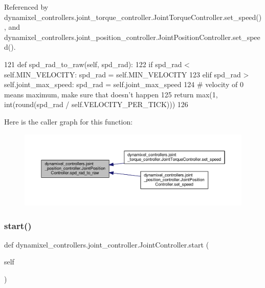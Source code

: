 Referenced by dynamixel\+\_\+controllers.\+joint\+\_\+torque\+\_\+controller.\+Joint\+Torque\+Controller.\+set\+\_\+speed(), and dynamixel\+\_\+controllers.\+joint\+\_\+position\+\_\+controller.\+Joint\+Position\+Controller.\+set\+\_\+speed().


\begin{DoxyCode}
121     \textcolor{keyword}{def }spd\_rad\_to\_raw(self, spd\_rad):
122         \textcolor{keywordflow}{if} spd\_rad < self.MIN\_VELOCITY: spd\_rad = self.MIN\_VELOCITY
123         \textcolor{keywordflow}{elif} spd\_rad > self.joint\_max\_speed: spd\_rad = self.joint\_max\_speed
124         \textcolor{comment}{# velocity of 0 means maximum, make sure that doesn't happen}
125         \textcolor{keywordflow}{return} max(1, int(round(spd\_rad / self.VELOCITY\_PER\_TICK)))
126 
\end{DoxyCode}
Here is the caller graph for this function\+:
\nopagebreak
\begin{figure}[H]
\begin{center}
\leavevmode
\includegraphics[width=350pt]{d1/df0/classdynamixel__controllers_1_1joint__position__controller_1_1_joint_position_controller_ac82aa3145e2ba55f75b43563827828d5_icgraph}
\end{center}
\end{figure}
\mbox{\label{classdynamixel__controllers_1_1joint__controller_1_1_joint_controller_a8da16a8b801f868a4de7c68d6adc851f}} 
\subsubsection{\texorpdfstring{start()}{start()}}
{\footnotesize\ttfamily def dynamixel\+\_\+controllers.\+joint\+\_\+controller.\+Joint\+Controller.\+start (\begin{DoxyParamCaption}\item[{}]{self }\end{DoxyParamCaption})\hspace{0.3cm}{\ttfamily [inherited]}}



